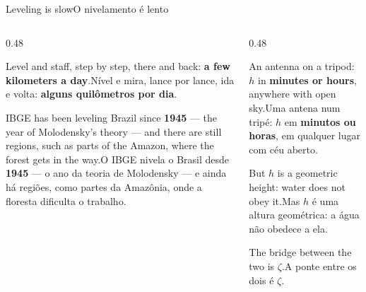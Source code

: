 \documentclass[aspectratio=169,11pt]{beamer}
\newcommand{\tr}[2]{\ifEN#2\else#1\fi}
\newcommand{\bnum}[1]{\textbf{\textcolor{mTeal}{#1}}}
\begin{document}
\begin{frame}{\tr{O nivelamento é lento}{Leveling is slow}}
  \begin{columns}[T]
    \begin{column}{0.48\textwidth}
      \begin{cuidado}[title={\tr{Nivelamento}{Leveling}}]
        \tr{Nível e mira, lance por lance, ida e volta: \bnum{alguns quilômetros por dia}.}{Level
        and staff, step by step, there and back: \bnum{a few kilometers a day}.}
        \medskip

        \tr{O IBGE nivela o Brasil desde \bnum{1945} --- o ano da teoria de Molodensky --- e
        ainda há regiões, como partes da Amazônia, onde a floresta dificulta o
        trabalho.}{IBGE has been leveling Brazil since \bnum{1945} --- the year of Molodensky's
        theory --- and there are still regions, such as parts of the Amazon, where the forest
        gets in the way.}
      \end{cuidado}
    \end{column}
    \begin{column}{0.48\textwidth}
      \begin{regra}[title={GNSS}]
        \tr{Uma antena num tripé: $h$ em \bnum{minutos ou horas}, em qualquer lugar com céu
        aberto.}{An antenna on a tripod: $h$ in \bnum{minutes or hours}, anywhere with open
        sky.}
        \medskip

        \tr{Mas $h$ é uma altura \alert{geométrica}: a água não obedece a ela.}{But $h$ is a
        \alert{geometric} height: water does not obey it.}
      \end{regra}
      \medskip
      \centering
      \tr{A ponte entre os dois é $\zeta$.}{The bridge between the two is $\zeta$.}
    \end{column}
  \end{columns}
\end{frame}
\end{document}

